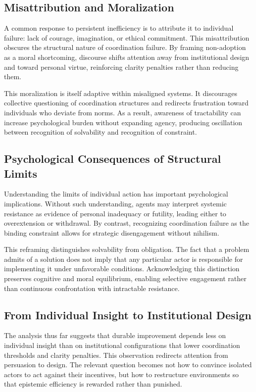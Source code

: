 \documentclass[11pt]{article}
\begin{document}
\subsection{Misattribution and Moralization}

A common response to persistent inefficiency is to attribute it to individual failure: lack of courage, imagination, or ethical commitment. This misattribution obscures the structural nature of coordination failure. By framing non-adoption as a moral shortcoming, discourse shifts attention away from institutional design and toward personal virtue, reinforcing clarity penalties rather than reducing them.

This moralization is itself adaptive within misaligned systems. It discourages collective questioning of coordination structures and redirects frustration toward individuals who deviate from norms. As a result, awareness of tractability can increase psychological burden without expanding agency, producing oscillation between recognition of solvability and recognition of constraint.

\subsection{Psychological Consequences of Structural Limits}

Understanding the limits of individual action has important psychological implications. Without such understanding, agents may interpret systemic resistance as evidence of personal inadequacy or futility, leading either to overextension or withdrawal. By contrast, recognizing coordination failure as the binding constraint allows for strategic disengagement without nihilism.

This reframing distinguishes solvability from obligation. The fact that a problem admits of a solution does not imply that any particular actor is responsible for implementing it under unfavorable conditions. Acknowledging this distinction preserves cognitive and moral equilibrium, enabling selective engagement rather than continuous confrontation with intractable resistance.

\subsection{From Individual Insight to Institutional Design}

The analysis thus far suggests that durable improvement depends less on individual insight than on institutional configurations that lower coordination thresholds and clarity penalties. This observation redirects attention from persuasion to design. The relevant question becomes not how to convince isolated actors to act against their incentives, but how to restructure environments so that epistemic efficiency is rewarded rather than punished.
\end{document}
